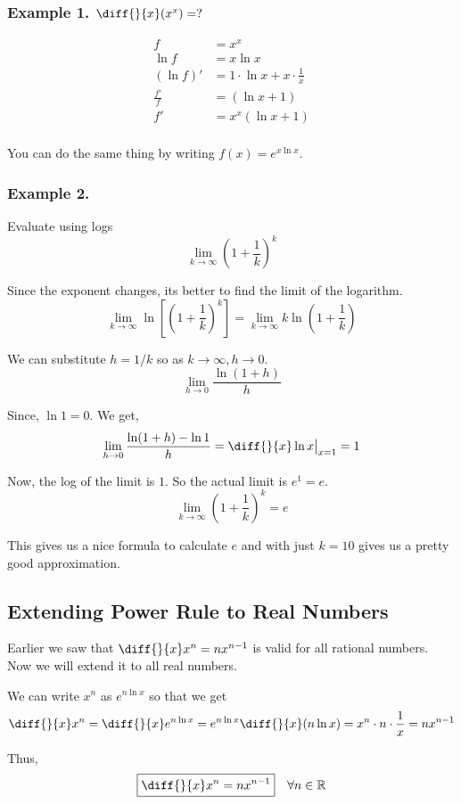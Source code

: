 \subsubsection{Example 1. $\diff{}{x}(x^x) = ?$}

\begin{equation*}
\begin{split}
	f & = x^x \\
	\ln f & = x \ln x \\
	(\ln f)' & = 1 \cdot \ln x + x \cdot \frac{1}{x} \\
	\frac{f'}{f} & = (\ln x + 1) \\
	f' & = x^x(\ln x + 1) \\
\end{split}
\end{equation*}

You can do the same thing by writing $f(x) = e^{x \ln x}$.

\subsubsection{Example 2.}
Evaluate using logs $$ \lim_{k \to \infty} \left( 1+\frac{1}{k} \right)^k $$

Since the exponent changes, its better to find the limit of the logarithm.
$$ 
\lim_{k \to \infty} \ln \left[ \left( 1 + \frac{1}{k} \right)^k \right] 
	= \lim_{k \to \infty} k \ln \left( 1 + \frac{1}{k} \right)
$$

We can substitute $h = 1/k$ so as $k \to \infty, h \to 0$.
$$ \lim_{h \to 0} \frac{\ln(1+h)}{h} $$

Since, $\ln 1 = 0$. We get,
$$ \lim_{h \to 0} \frac{\ln(1+h) - \ln 1}{h} = \diff{}{x} \ln x \big|_{x=1} = 1 $$

Now, the log of the limit is $1$. So the actual limit is $e^1 = e$.
$$ \lim_{k \to \infty} \left( 1 + \frac{1}{k} \right)^k = e $$

This gives us a nice formula to calculate $e$ and with just $k = 10$ gives us a pretty good approximation.


\subsection{Extending Power Rule to Real Numbers}

Earlier we saw that $\diff{}{x} x^n = nx^{n-1}$ is valid for all rational numbers.
Now we will extend it to all real numbers. 

We can write $x^n$ as $e^{n \ln x}$ so that we get
$$ \diff{}{x} x^n = \diff{}{x} e^{n \ln x} 
	= e^{n \ln x} \diff{}{x} (n \ln x)
	= x^n \cdot n \cdot \frac{1}{x}
	= n x^{n-1}
$$

Thus, $$ \boxed{ \diff{}{x} x^n = nx^{n-1} } \quad \forall n \in \mathbb{R} $$
